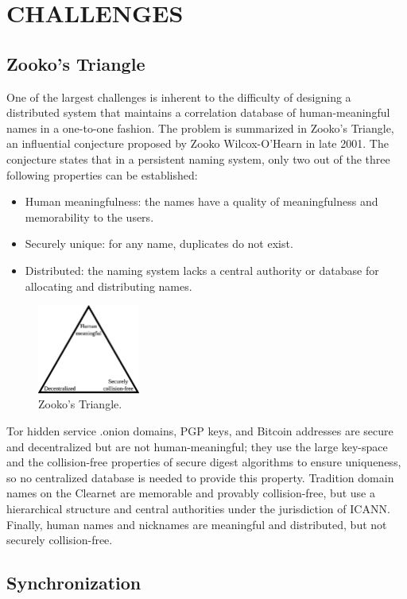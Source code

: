 
\chapter{CHALLENGES}

\section{Zooko's Triangle}
\label{sec:ZookosTriangle}

One of the largest challenges is inherent to the difficulty of designing a distributed system that maintains a correlation database of human-meaningful names in a one-to-one fashion. The problem is summarized in Zooko's Triangle, an influential conjecture proposed by Zooko Wilcox-O'Hearn in late 2001. The conjecture states that in a persistent naming system, only two out of the three following properties can be established:\cite{ferdous2009security}

\begin{itemize}
  \item Human meaningfulness: the names have a quality of meaningfulness and memorability to the users. 
  \item Securely unique: for any name, duplicates do not exist.
  \item Distributed: the naming system lacks a central authority or database for allocating and distributing names.
\end{itemize}

\begin{figure}[htbp]
	\centering
	\includegraphics[width=0.3\textwidth]{images/Zooko.eps}
	\caption{Zooko's Triangle.}
\end{figure}

Tor hidden service .onion domains, PGP keys, and Bitcoin addresses are secure and decentralized but are not human-meaningful; they use the large key-space and the collision-free properties of secure digest algorithms to ensure uniqueness, so no centralized database is needed to provide this property. Tradition domain names on the Clearnet are memorable and provably collision-free, but use a hierarchical structure and central authorities under the jurisdiction of ICANN. Finally, human names and nicknames are meaningful and distributed, but not securely collision-free.\cite{stiegler2005petname}

\section{Synchronization}



